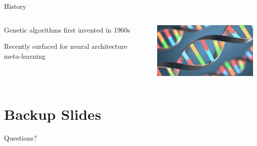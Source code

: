 \documentclass[aspectratio=169]{beamer}
\begin{document}
\begin{frame}{History}
  \begin{columns}[T]
      \begin{column}{.5\linewidth}
          \begin{vfilleditems}
              \item {\Large Genetic algorithms first invented in 1960s}
              \vspace{1em}
              \item {\Large Recently surfaced for neural architecture meta-learning}
          \end{vfilleditems}
      \end{column}
      \begin{column}{.5\linewidth}
          \begin{vfilleditems}
              \includegraphics[width=6cm, keepaspectratio]{figures/genetic.jpg}
          \end{vfilleditems}
      \end{column}
  \end{columns}
\end{frame}


\appendix %
\section*{Backup Slides}
\begin{frame}
  \centering
  \vfill
  {\fontsize{40}{50}\selectfont Questions?}
  \vfill
\end{frame}

\begin{frame}
  \centering
  \printbibliography
\end{frame}
\end{document}
